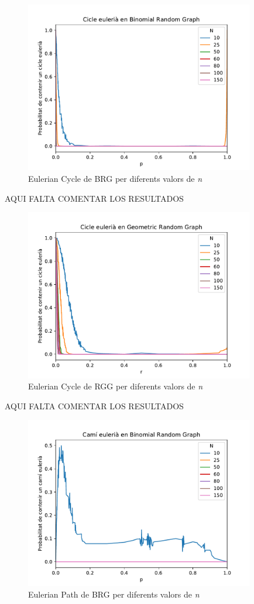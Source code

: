 \begin{figure}[H]
    \centering
    \includegraphics[width=10cm]{plots/BRG_eulerianCycle.pdf}
    \caption{Eulerian Cycle de BRG per diferents valors de \textit{n}}
    \label{fig:connect_04}
\end{figure}

AQUI FALTA COMENTAR LOS RESULTADOS

\begin{figure}[H]
    \centering
    \includegraphics[width=10cm]{plots/GRG_eulerianCycle.pdf}
    \caption{Eulerian Cycle de RGG per diferents valors de \textit{n}}
    \label{fig:connect_04}
\end{figure}

AQUI FALTA COMENTAR LOS RESULTADOS

\begin{figure}[H]
    \centering
    \includegraphics[width=10cm]{plots/BRG_eulerianPath.pdf}
    \caption{Eulerian Path de BRG per diferents valors de \textit{n}}
    \label{fig:connect_04}
\end{figure}

